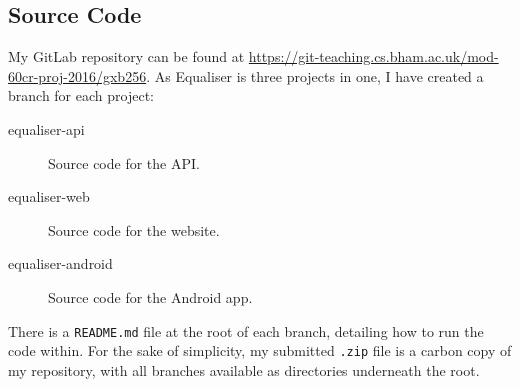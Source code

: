 \documentclass[12pt,a4paper]{bhamdissertation}
\newcommand{\code}[1]{\texttt{#1}}
\begin{document}
\appendix
\begin{appendices}


\chapter{Source Code}
\label{appendix:source_code}

My GitLab repository can be found at \url{https://git-teaching.cs.bham.ac.uk/mod-60cr-proj-2016/gxb256}. As Equaliser is three projects in one, I have created a branch for each project:

\begin{description}
    \item[equaliser-api] Source code for the API.
    \item[equaliser-web] Source code for the website.
    \item[equaliser-android] Source code for the Android app.
\end{description}

There is a \code{README.md} file at the root of each branch, detailing how to run the code within. For the sake of simplicity, my submitted \code{.zip} file is a carbon copy of my repository, with all branches available as directories underneath the root.

\end{appendices}

\cleardoublepage  %
\printbibliography
\end{document}
